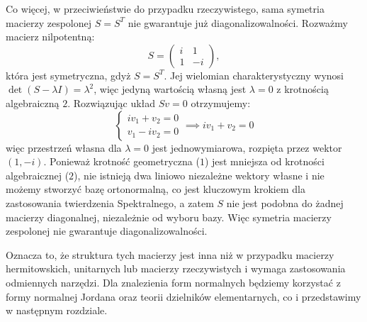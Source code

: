 Co więcej, w przeciwieństwie do przypadku rzeczywistego, sama symetria macierzy zespolonej $S = S^T$ nie gwarantuje już diagonalizowalności. Rozważmy macierz nilpotentną:
$$ S = \begin{pmatrix} i & 1 \\ 1 & -i \end{pmatrix}, $$
która jest symetryczna, gdyż $S = S^T$. Jej wielomian charakterystyczny wynosi $\det(S - \lambda I) = \lambda^2$, więc jedyną wartością własną jest $\lambda = 0$ z krotnością algebraiczną $2$. Rozwiązując układ $Sv = 0$ otrzymujemy: 
$$\begin{cases}
    iv_1 + v_2 = 0 \\
    v_1 - iv_2 = 0
\end{cases} \implies iv_1 + v_2 = 0$$
więc przestrzeń własna dla $\lambda = 0$ jest jednowymiarowa, rozpięta przez wektor $(1, -i)$. Ponieważ krotność geometryczna ($1$) jest mniejsza od krotności algebraicznej ($2$), nie istnieją dwa liniowo niezależne wektory własne i nie możemy stworzyć bazę ortonormalną, co jest kluczowym krokiem dla zastosowania twierdzenia Spektralnego, a zatem $S$ nie jest podobna do żadnej macierzy diagonalnej, niezależnie od wyboru bazy. Więc symetria macierzy zespolonej nie gwarantuje diagonalizowalności.

Oznacza to, że struktura tych macierzy jest inna niż w przypadku macierzy hermitowskich, unitarnych lub macierzy rzeczywistych i wymaga zastosowania odmiennych narzędzi. Dla znalezienia form normalnych będziemy korzystać z formy normalnej Jordana oraz teorii dzielników elementarnych, co i przedstawimy w następnym rozdziale.